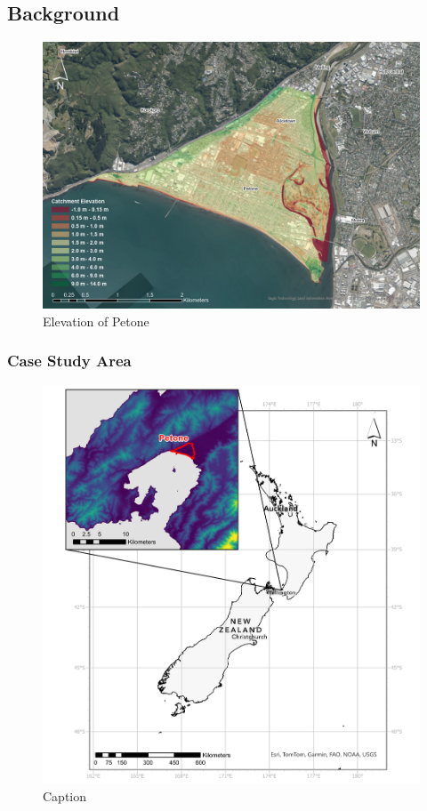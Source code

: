 \subsection{Background}

\begin{landscape}
\begin{figure}
    \centering
    \includegraphics[width=1.0\linewidth]{Content/Figures/01_Introduction/Elevation-map.pdf}
    \caption{Elevation of Petone}
    \label{fig:elevation-map}
\end{figure}
\end{landscape}

\subsubsection{Case Study Area}

\begin{figure}
    \centering
    \includegraphics[width=1.0\linewidth]{Content/Figures/01_Introduction/study-area.pdf}
    \caption{Caption}
    \label{fig:enter-label}
\end{figure}

